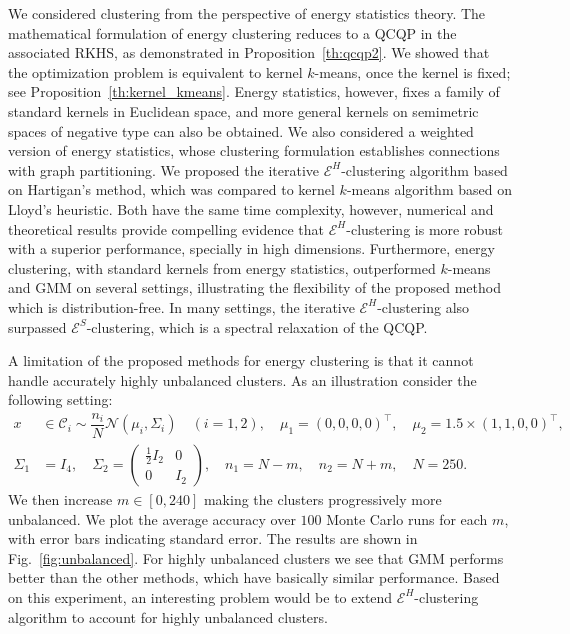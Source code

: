 \documentclass[aps,preprint,nofootinbib,floatfix]{revtex4-1}
\newcommand\C{{\mathcal{C}}}
\begin{document}
We considered clustering from the perspective of energy
statistics theory.
The mathematical formulation of energy clustering 
reduces to a QCQP in the associated RKHS, as demonstrated in 
Proposition~\ref{th:qcqp2}.
We showed that the optimization problem
is equivalent
to kernel $k$-means, once the kernel is fixed; see
Proposition~\ref{th:kernel_kmeans}. Energy statistics, however, fixes
a family of standard kernels in Euclidean space, and
more general kernels 
on semimetric spaces of negative type can also be obtained.
We also considered a weighted version of energy statistics, whose 
clustering formulation establishes connections with 
graph partitioning.
We proposed the iterative $\mathcal{E}^H$-clustering algorithm based on 
Hartigan's method, which was compared to kernel $k$-means algorithm
based on Lloyd's heuristic.
Both have the same time complexity, however, numerical and theoretical
results provide compelling evidence that $\mathcal{E}^H$-clustering
is more robust with a superior performance, specially in high
dimensions. 
Furthermore, energy clustering, with standard kernels from energy
statistics, outperformed $k$-means and GMM
on several settings, illustrating the flexibility
of the proposed method which is distribution-free. In many
settings, the iterative
$\mathcal{E}^H$-clustering also surpassed $\mathcal{E}^S$-clustering, which
is a spectral relaxation of the QCQP.

A limitation of the proposed methods for energy clustering is that it cannot
handle accurately highly unbalanced clusters. As an illustration
consider the following setting:
\begin{equation}
\label{eq:gauss3}
\begin{split}
x &\in \C_i \sim  
\dfrac{n_i}{N} \mathcal{N}(\mu_i,\Sigma_i) \quad (i=1,2), \quad 
\mu_1 = (0,0,0,0)^\top , \quad
\mu_2 = 1.5\times (1,1,0,0)^\top, \\
\Sigma_1 &= I_4, \quad
\Sigma_2 = \left( 
\begin{array}{c|c} 
\tfrac{1}{2} I_2 & 0  \\ \hline
0 & I_2 
\end{array}\right), \quad
n_1 = N - m, \quad  n_2 = N + m, \quad N=250.
\end{split}
\end{equation}
We then increase $m \in [0,240]$ making
the clusters progressively more unbalanced.
We plot the average accuracy over
$100$ Monte Carlo runs for each $m$, with error bars indicating 
standard error. 
The results are shown in Fig.~\ref{fig:unbalanced}.
For highly unbalanced clusters we see that GMM performs better than
the other methods, which have basically similar performance.
Based on this experiment, an interesting problem would be to
extend $\mathcal{E}^H$-clustering algorithm to account for 
highly unbalanced clusters.
\end{document}
